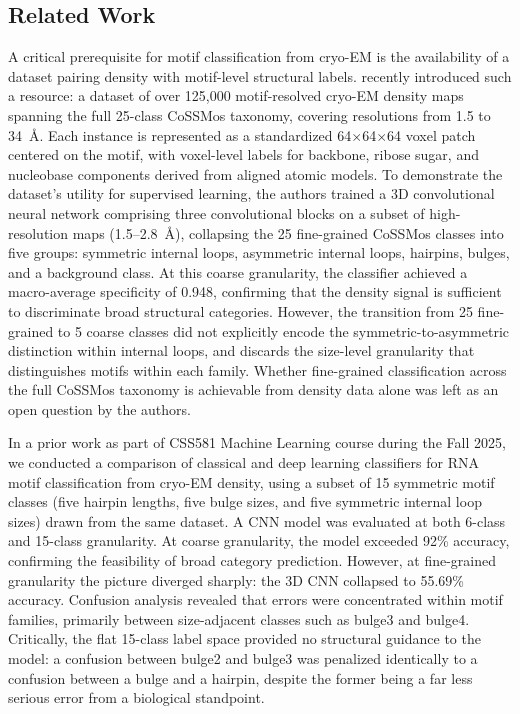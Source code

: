 \documentclass[sigconf]{acmart}
\begin{document}
\subsection{Related Work}
A critical prerequisite for motif classification from
cryo-EM is the availability of a dataset pairing density with motif-level structural labels.
\citeauthor{murugadass2026} \cite{murugadass2026} recently introduced
such a resource: a dataset of over 125,000 motif-resolved cryo-EM
density maps spanning the full 25-class CoSSMos taxonomy, covering
resolutions from 1.5 to 34~\AA{}. Each instance is represented as a
standardized 64$\times$64$\times$64 voxel patch centered on the motif,
with voxel-level labels for backbone, ribose sugar, and nucleobase
components derived from aligned atomic models. To demonstrate the
dataset's utility for supervised learning, the authors trained a 3D convolutional neural network comprising three
convolutional blocks on a subset of high-resolution maps
(1.5--2.8~\AA{}), collapsing the 25 fine-grained CoSSMos classes into
five groups: symmetric internal loops, asymmetric internal loops,
hairpins, bulges, and a background class. At this coarse granularity,
the classifier achieved a macro-average specificity of 0.948, confirming
that the density signal is sufficient to discriminate broad structural
categories. However, the transition from 25 fine-grained to 5 coarse
classes did not explicitly encode the
symmetric-to-asymmetric distinction within internal loops, and
discards the size-level granularity that distinguishes motifs within
each family. Whether fine-grained classification across the full
CoSSMos taxonomy is achievable from density data alone was left as
an open question by the authors.
 
In a prior work as part of CSS581 Machine Learning course during the Fall 2025, we conducted a comparison of classical
and deep learning classifiers for RNA motif classification from
cryo-EM density, using a subset of 15 symmetric motif classes (five
hairpin lengths, five bulge sizes, and five symmetric internal loop
sizes) drawn from the same dataset. A CNN model was evaluated at both
6-class and 15-class granularity. At coarse granularity,
the model exceeded 92\% accuracy, confirming the feasibility of
broad category prediction. However, at fine-grained granularity the
picture diverged sharply: the 3D CNN collapsed to 55.69\% accuracy. Confusion analysis revealed that errors were
concentrated within motif families, primarily between size-adjacent
classes such as bulge3 and bulge4. Critically, the
flat 15-class label space provided no structural guidance to the
model: a confusion between bulge2 and bulge3 was penalized identically
to a confusion between a bulge and a hairpin, despite the former being
a far less serious error from a biological standpoint.
 
\end{document}
